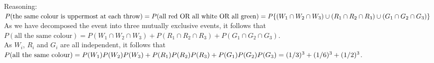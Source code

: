 \documentclass[bigtut]{tutorial}\usepackage[]{graphicx}\usepackage[]{color}
\begin{document}
\begin{tutorial}
\begin{questions}
\begin{solution}
Reasoning: \\
$P(\text{the same colour is uppermost at each throw}) = P(\text{all red OR all white OR all green}) \\
= P\{(W_1\cap W_2\cap W_3) \cup (R_1\cap R_2\cap R_3) \cup (G_1\cap G_2\cap G_3) \}$ \\

As we have decomposed the event into three mutually exclusive events, it follows that \\
$P(\text{all the same colour})
= P(W_1\cap W_2\cap W_3) + P(R_1\cap R_2\cap R_3) + P(G_1\cap G_2\cap G_3)$. \\

As $W_{i}$, $R_{i}$ and $G_{i}$ are all independent, it follows that \\
$P(\text{all the same colour})
= P(W_1)P(W_2)P(W_3) + P(R_1)P(R_2)P(R_3) + P(G_1)P(G_2)P(G_3) = \\
 (1/3)^3 + (1/6)^3 + (1/2)^3$.

\end{solution}

\end{questions}
\end{tutorial}
\end{document}
